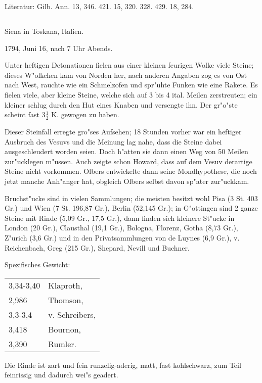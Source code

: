 \documentclass[a4paper, 11pt, oneside]{article}
\begin{document}
\normalsize
Literatur: Gilb. Ann. 13, 346. 421. 15, 320. 328. 429. 18, 284.
\subsection{}
\LARGE
\paragraph{}
Siena in Toskana, Italien.

1794, Juni 16, nach 7 Uhr Abends.

Unter heftigen Detonationen fielen aus einer kleinen feurigen Wolke viele Steine; dieses W"olkchen kam von Norden her, nach anderen Angaben zog es von Ost nach West, rauchte wie ein Schmelzofen und spr"uhte Funken wie eine Rakete. Es fielen viele, aber kleine Steine, welche sich auf 3 bis 4 ital. Meilen zerstreuten; ein kleiner schlug durch den Hut eines Knaben und versengte ihn. Der gr"o"ste scheint fast $\mathfrak{3\frac{1}{2}}$ K. gewogen zu haben.

Dieser Steinfall erregte gro"ses Aufsehen; 18 Stunden vorher war ein heftiger Ausbruch des Vesuvs und die Meinung lag nahe, dass die Steine dabei ausgeschleudert worden seien. Doch h"atten sie dann einen Weg von 50 Meilen zur"ucklegen m"ussen. Auch zeigte schon Howard, dass auf dem Vesuv derartige Steine nicht vorkommen. Olbers entwickelte dann seine Mondhypothese, die noch jetzt manche Anh"anger hat, obgleich Olbers selbst davon sp"ater zur"uckkam.

Bruchst"ucke sind in vielen Sammlungen; die meisten besitzt wohl Pisa (3 St. 403 Gr.) und Wien (7 St. 196,87 Gr.), Berlin (52,145 Gr.); in G"ottingen sind 2 ganze Steine mit Rinde (5,09 Gr., 17,5 Gr.), dann finden sich kleinere St"ucke in London (20 Gr.), Clausthal (19,1 Gr.), Bologna, Florenz, Gotha (8,73 Gr.), Z"urich (3,6 Gr.) und in den Privatsammlungen von de Luynes (6,9 Gr.), v. Reichenbach, Greg (215 Gr.), Shepard, Nevill und Buchner.

Spezifisches Gewicht:
\begin{table}[!ht]
    \centering\swabfamily\Large
    \begin{tabular}{l l}
        3,34-3,40 & Klaproth,\\
        2,986 & Thomson,\\
        3,3-3,4 & v. Schreibers,\\
        3,418 & Bournon,\\
        3,390 & Rumler.
    \end{tabular}
\end{table}
Die Rinde ist zart und fein runzelig-aderig, matt, fast kohlschwarz, zum Teil feinrissig und dadurch wei"s geadert.
\end{document}
